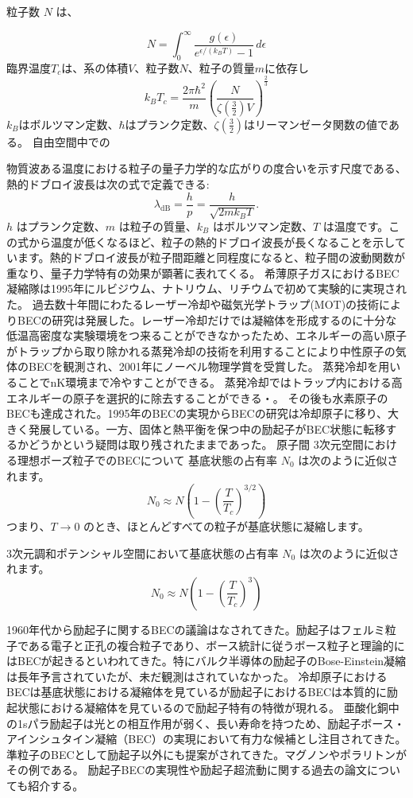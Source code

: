 粒子数 \( N \) は、

\[
N = \int_{0}^{\infty} \frac{g(\epsilon)}{e^{\epsilon/(k_B T)} - 1} \, d\epsilon
\]
臨界温度$T_c$は、系の体積$V$、粒子数$N$、粒子の質量$m$に依存し
\begin{equation}
k_B T_c = \frac{2 \pi \hbar^2}{m} \left( \frac{N}{\zeta\left(\frac{3}{2}\right) V} \right)^{\frac{2}{3}}
\end{equation}
$k_B$はボルツマン定数、$\hbar$はプランク定数、$\zeta\left(\frac{3}{2}\right)$はリーマンゼータ関数の値である。
自由空間中での

物質波ある温度における粒子の量子力学的な広がりの度合いを示す尺度である、熱的ドブロイ波長は次の式で定義できる:
\[
\lambda_{\text{dB}} = \frac{h}{p} = \frac{h}{\sqrt{2 m k_B T}}.
\]
$h$ はプランク定数、$m$ は粒子の質量、$k_B$ はボルツマン定数、$T$ は温度です。この式から温度が低くなるほど、粒子の熱的ドブロイ波長が長くなることを示しています。熱的ドブロイ波長が粒子間距離と同程度になると、粒子間の波動関数が重なり、量子力学特有の効果が顕著に表れてくる。
希薄原子ガスにおけるBEC凝縮隊は1995年にルビジウム、ナトリウム、リチウムで初めて実験的に実現された。
過去数十年間にわたるレーザー冷却や磁気光学トラップ(MOT)の技術によりBECの研究は発展した。レーザー冷却だけでは凝縮体を形成するのに十分な低温高密度な実験環境をつ来ることができなかったため、エネルギーの高い原子がトラップから取り除かれる蒸発冷却の技術を利用することにより中性原子の気体のBECを観測され、2001年にノーベル物理学賞を受賞した。
蒸発冷却を用いることでnK環境まで冷やすことができる。
蒸発冷却ではトラップ内における高エネルギーの原子を選択的に除去することができる・。
その後も水素原子のBECも達成された。1995年のBECの実現からBECの研究は冷却原子に移り、大きく発展している。一方、固体と熱平衡を保つ中の励起子がBEC状態に転移するかどうかという疑問は取り残されたままであった。
原子間
3次元空間における理想ボーズ粒子でのBECについて
基底状態の占有率 $N_0$ は次のように近似されます。
\[
N_0 \approx N \left( 1 - \left( \frac{T}{T_c} \right)^{3/2} \right)
\]
つまり、$T \to 0$ のとき、ほとんどすべての粒子が基底状態に凝縮します。

3次元調和ポテンシャル空間において基底状態の占有率 $N_0$ は次のように近似されます。
\[
N_0 \approx N \left( 1 - \left( \frac{T}{T_c} \right)^{3} \right)
\]

1960年代から励起子に関するBECの議論はなされてきた。励起子はフェルミ粒子である電子と正孔の複合粒子であり、ボース統計に従うボース粒子と理論的にはBECが起きるといわれてきた。特にバルク半導体の励起子のBose-Einstein凝縮は長年予言されていたが、未だ観測はされていなかった。
冷却原子におけるBECは基底状態における凝縮体を見ているが励起子におけるBECは本質的に励起状態における凝縮体を見ているので励起子特有の特徴が現れる。
亜酸化銅中の1sパラ励起子は光との相互作用が弱く、長い寿命を持つため、励起子ボース・アインシュタイン凝縮（BEC）の実現において有力な候補とし注目されてきた。
準粒子のBECとして励起子以外にも提案がされてきた。マグノンやポラリトンがその例である。
励起子BECの実現性や励起子超流動に関する過去の論文についても紹介する。
